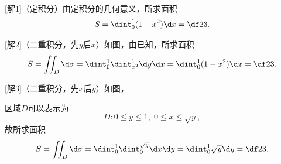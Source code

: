 [解1]（定积分）由定积分的几何意义，所求面积
$$S=\dint_0^1(1-x^2)\d x=\df23.$$

[解2]（二重积分，先$y$后$x$）如图，由已知，所求面积
$$S=\iint_D\d\sigma=\dint_0^1\dint_{x^2}^1\d y\d x
=\dint_0^1(1-x^2)\d x=\df23.$$

[解3]（二重积分，先$x$后$y$）如图，

\begin{center}
\end{center}

区域$D$可以表示为
$$D:0\leq y\leq 1,\;0\leq x\leq\sqrt y,$$
故所求面积
$$S=\iint_D\d\sigma=\dint_0^1\dint_0^{\sqrt y}\d x\d y
=\dint_0^1\sqrt y\d y=\df23.$$

